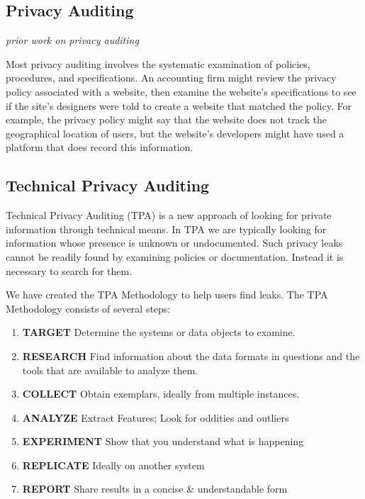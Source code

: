 \subsection{Privacy Auditing}

\emph{prior work on privacy auditing}

Most privacy auditing involves the systematic examination of policies,
procedures, and specifications. An accounting firm might review the
privacy policy associated with a website, then examine the website's
specifications to see if the site's designers were told to create a
website that matched the policy. For example, the privacy policy might
say that the website does not track the geographical location of
users, but the website's developers might have used a platform that
does record this information. 


\subsection{Technical Privacy Auditing}

Technical Privacy Auditing (TPA) is a new approach of looking for private
information through technical means.  In TPA we are typically looking
for information whose presence is unknown or undocumented. Such
privacy leaks cannot be readily found by examining policies or
documentation. Instead it is necessary to search for them.

We have created the TPA Methodology to help users find leaks. The TPA
Methodology consists of several steps:

\begin{enumerate}
\item \textbf{TARGET} Determine the systems or data objects to examine.
\item \textbf{RESEARCH} Find information about the data formats in
  questions and the tools that are available to analyze them. 
\item \textbf{COLLECT} Obtain exemplars, ideally from multiple instances.
\item \textbf{ANALYZE} Extract Features; Look for oddities and outliers
\item \textbf{EXPERIMENT} Show that you understand what is happening
\item \textbf{REPLICATE} Ideally on another system
\item \textbf{REPORT} Share results in a concise \& understandable form
\end{enumerate}


